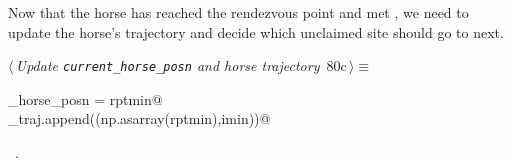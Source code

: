 \documentclass[11.5pt]{report}
\begin{document}
\vspace{-0.8cm} \newchunk Now that the horse has reached the rendezvous point and met , 
we need to update the horse's trajectory and decide which unclaimed site  should go to next. 
\begin{flushleft} \small
\begin{minipage}{\linewidth}\label{scrap125}\raggedright\small
{} $\langle\,${\itshape Update \verb|current_horse_posn| and horse trajectory}\nobreak\ {\footnotesize {80c}}$\,\rangle\equiv$
\vspace{-1ex}
\begin{list}{}{} \item
\mbox{}\verb@current_horse_posn = rptmin@\\
\mbox{}\verb@horse_traj.append((np.asarray(rptmin),imin))@\\
\mbox{}\verb@@{\NWsep}
\end{list}
\vspace{-1.5ex}
\footnotesize
\begin{list}{}{\setlength{\itemsep}{-\parsep}\setlength{\itemindent}{-\leftmargin}}
\item \NWtxtMacroRefIn\ .

\item{}
\end{list}
\end{minipage}\vspace{4ex}
\end{flushleft}
\end{document}
